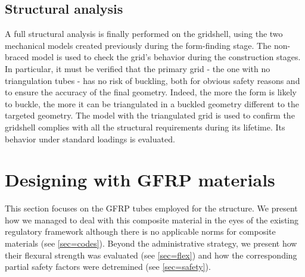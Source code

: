 \subsection{Structural analysis}
A full structural analysis is finally performed on the gridshell, using the two mechanical models created previously during the form-finding stage.
The non-braced model is used to check the grid’s behavior during the construction stages. In particular, it must be verified that the primary grid - the one with no triangulation tubes - has no risk of buckling, both for obvious safety reasons and to ensure the accuracy of the final geometry. Indeed, the more the form is likely to buckle, the more it can be triangulated in a buckled geometry different to the targeted geometry. The model with the triangulated grid is used to confirm the gridshell complies with all the structural requirements during its lifetime. Its behavior under standard loadings is evaluated.

\clearpage
\section{Designing with GFRP materials}\label{sec=design_gfrp}
This section focuses on the GFRP tubes employed for the structure. We present how we managed to deal with this composite material in the eyes of the existing regulatory framework although there is no applicable norms for composite materials (see \cref{sec=codes}). Beyond the administrative strategy, we present how their flexural strength was evaluated (see \cref{sec=flex}) and how the corresponding partial safety factors were detremined (see \cref{sec=safety}).

